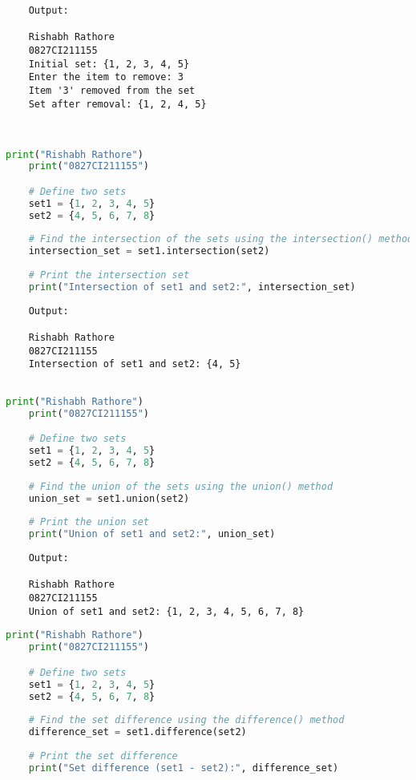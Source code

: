 \documentclass{report}
\begin{document}
\begin{verbatim}
	Output:

	Rishabh Rathore
	0827CI211155
	Initial set: {1, 2, 3, 4, 5}
	Enter the item to remove: 3
	Item '3' removed from the set
	Set after removal: {1, 2, 4, 5}
	
	

\end{verbatim}


\bigskip


\sol 
\begin{lstlisting}[language=Python]
	print("Rishabh Rathore")
	print("0827CI211155")

	# Define two sets
	set1 = {1, 2, 3, 4, 5}
	set2 = {4, 5, 6, 7, 8}
	
	# Find the intersection of the sets using the intersection() method
	intersection_set = set1.intersection(set2)
	
	# Print the intersection set
	print("Intersection of set1 and set2:", intersection_set)
\end{lstlisting}

\begin{verbatim}
	Output:

	Rishabh Rathore
	0827CI211155
	Intersection of set1 and set2: {4, 5}
	
\end{verbatim}


\bigskip


\sol 
\begin{lstlisting}[language=Python]
	print("Rishabh Rathore")
	print("0827CI211155")

	# Define two sets
	set1 = {1, 2, 3, 4, 5}
	set2 = {4, 5, 6, 7, 8}
	
	# Find the union of the sets using the union() method
	union_set = set1.union(set2)
	
	# Print the union set
	print("Union of set1 and set2:", union_set)
\end{lstlisting}

\begin{verbatim}
	Output:

	Rishabh Rathore
	0827CI211155
	Union of set1 and set2: {1, 2, 3, 4, 5, 6, 7, 8}

\end{verbatim}


\bigskip


\sol 
\begin{lstlisting}[language=Python]
	print("Rishabh Rathore")
	print("0827CI211155")

	# Define two sets
	set1 = {1, 2, 3, 4, 5}
	set2 = {4, 5, 6, 7, 8}
	
	# Find the set difference using the difference() method
	difference_set = set1.difference(set2)
	
	# Print the set difference
	print("Set difference (set1 - set2):", difference_set)
\end{lstlisting}
\end{document}
